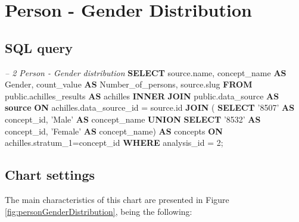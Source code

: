 \documentclass[]{book}
\newenvironment{Shaded}{\begin{snugshade}}{\end{snugshade}}
\newcommand{\KeywordTok}[1]{\textcolor[rgb]{0.13,0.29,0.53}{\textbf{#1}}}
\newcommand{\DecValTok}[1]{\textcolor[rgb]{0.00,0.00,0.81}{#1}}
\newcommand{\StringTok}[1]{\textcolor[rgb]{0.31,0.60,0.02}{#1}}
\newcommand{\CommentTok}[1]{\textcolor[rgb]{0.56,0.35,0.01}{\textit{#1}}}
\newcommand{\NormalTok}[1]{#1}
\begin{document}
\section{Person - Gender
Distribution}\label{person---gender-distribution}

\subsection{SQL query}\label{sql-query-9}

\begin{Shaded}
\begin{Highlighting}[]
\CommentTok{-- 2  Person - Gender distribution}
\KeywordTok{SELECT}\NormalTok{ source.name,}
\NormalTok{       concept_name }\KeywordTok{AS}\NormalTok{ Gender, }
\NormalTok{       count_value }\KeywordTok{AS}\NormalTok{ Number_of_persons,}
\NormalTok{       source.slug}
\KeywordTok{FROM}\NormalTok{ public.achilles_results }\KeywordTok{AS}\NormalTok{ achilles }\KeywordTok{INNER} \KeywordTok{JOIN} 
\NormalTok{      public.data_source }\KeywordTok{AS} \KeywordTok{source} \KeywordTok{ON} 
\NormalTok{    achilles.data_source_id = source.id}
    \KeywordTok{JOIN}\NormalTok{ (}
        \KeywordTok{SELECT} \StringTok{'8507'} \KeywordTok{AS}\NormalTok{ concept_id, }\StringTok{'Male'} \KeywordTok{AS}\NormalTok{ concept_name }\KeywordTok{UNION} 
        \KeywordTok{SELECT} \StringTok{'8532'} \KeywordTok{AS}\NormalTok{ concept_id, }\StringTok{'Female'} \KeywordTok{AS}\NormalTok{ concept_name) }\KeywordTok{AS} 
\NormalTok{        concepts }\KeywordTok{ON}\NormalTok{ achilles.stratum_1=concept_id}
\KeywordTok{WHERE}\NormalTok{ analysis_id = }\DecValTok{2}\NormalTok{;}
\end{Highlighting}
\end{Shaded}

\subsection{Chart settings}\label{chart-settings-9}

The main characteristics of this chart are presented in Figure
\ref{fig:personGenderDistribution}, being the following:
\end{document}
